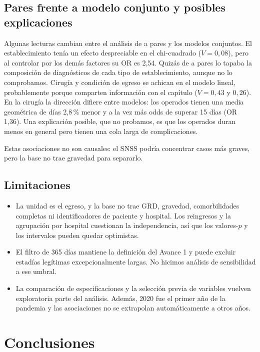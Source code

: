 \documentclass[10.5pt,a4paper,headings=small,abstract=false]{scrartcl}
\newcommand{\pct}{\,\%}
\begin{document}
\subsection{Pares frente a modelo conjunto y posibles explicaciones}

Algunas lecturas cambian entre el análisis de a pares y los modelos conjuntos. El establecimiento tenía un efecto despreciable en el chi-cuadrado ($V=0{,}08$), pero al controlar por los demás factores su OR es 2,54. Quizás de a pares lo tapaba la composición de diagnósticos de cada tipo de establecimiento, aunque no lo comprobamos. Cirugía y condición de egreso se achican en el modelo lineal, probablemente porque comparten información con el capítulo ($V=0{,}43$ y $0{,}26$). En la cirugía la dirección difiere entre modelos: los operados tienen una media geométrica de días 2,8\pct{} menor y a la vez más odds de superar 15 días (OR 1,36). Una explicación posible, que no probamos, es que los operados duran menos en general pero tienen una cola larga de complicaciones.

Estas asociaciones no son causales: el SNSS podría concentrar casos más graves, pero la base no trae gravedad para separarlo.

\subsection{Limitaciones}

\begin{itemize}\setlength\itemsep{0pt}
\item La unidad es el egreso, y la base no trae GRD, gravedad, comorbilidades completas ni identificadores de paciente y hospital. Los reingresos y la agrupación por hospital cuestionan la independencia, así que los valores-$p$ y los intervalos pueden quedar optimistas.
\item El filtro de 365 días mantiene la definición del Avance 1 y puede excluir estadías legítimas excepcionalmente largas. No hicimos análisis de sensibilidad a ese umbral.
\item La comparación de especificaciones y la selección previa de variables vuelven exploratoria parte del análisis. Además, 2020 fue el primer año de la pandemia y las asociaciones no se extrapolan automáticamente a otros años.
\end{itemize}

\section{Conclusiones}
\end{document}
